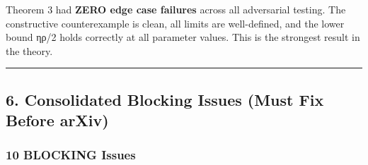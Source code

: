 \documentclass[
  12pt,
]{ctexart}
\begin{document}
Theorem 3 had \textbf{ZERO edge case failures} across all adversarial
testing. The constructive counterexample is clean, all limits are
well-defined, and the lower bound ηρ/2 holds correctly at all parameter
values. This is the strongest result in the theory.

\begin{center}\rule{0.5\linewidth}{0.5pt}\end{center}

\subsection{6. Consolidated Blocking Issues (Must Fix Before
arXiv)}\label{consolidated-blocking-issues-must-fix-before-arxiv}

\subsubsection{10 BLOCKING Issues}\label{blocking-issues}
\end{document}

